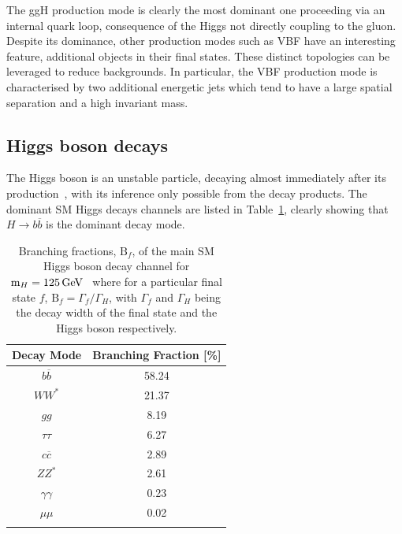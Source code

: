 The ggH production mode is clearly the most dominant one proceeding via an internal quark loop, consequence of the Higgs not directly coupling to the gluon. Despite its dominance, other production modes such as VBF have an interesting feature, additional objects in their final states. These distinct topologies can be leveraged to reduce backgrounds. In particular, the VBF production mode is characterised by two additional energetic jets which tend to have a large spatial separation and a high invariant mass.

\newpage
\subsection{Higgs boson decays}

The Higgs boson is an unstable particle, decaying almost immediately after its production~\cite{MarkThompson}, with its inference only possible from the decay products. The dominant SM Higgs decays channels are listed in Table~\ref{Table:Introduction_HiggsBranchingFractions}, clearly showing that $H\rightarrow b\overline{b}$ is the dominant decay mode. 

\begin{table}[h]
\centering
\renewcommand{\arraystretch}{1.5} %
\setlength{\tabcolsep}{12pt} %
\begin{tabular}{|c|c|}
\hline
Decay Mode                  & Branching Fraction {[}\%{]} \\ \hline \hline
$b\overline{b}$             & 58.24 \\ 
\arrayrulecolor{lightgray} \hline
$WW^*$                      & 21.37 \\ 
\arrayrulecolor{lightgray} \hline
$gg$                        & 8.19  \\ 
\arrayrulecolor{lightgray} \hline
$\tau\tau$                  & 6.27  \\ 
\arrayrulecolor{lightgray} \hline
$c\overline{c}$             & 2.89  \\ 
\arrayrulecolor{lightgray} \hline
$ZZ^*$                      & 2.61  \\ 
\arrayrulecolor{lightgray} \hline
$\gamma\gamma$              & 0.23  \\ 
\arrayrulecolor{lightgray} \hline
$\mu\mu$                    & 0.02  \\ 
\arrayrulecolor{black} \hline
\end{tabular}
\caption{Branching fractions, $\text{B}_f$, of the main SM Higgs boson decay channel for $\text{m}_H = 125\,\text{Ge\hspace{-.08em}V}$~\cite{HiggsProduction_XS_13TeV,HiggsProduction_XS_13p6TeV} where for a particular final state $f$, $\text{B}_f = \Gamma_f/\Gamma_H$, with $\Gamma_f$ and $\Gamma_H$ being the decay width of the final state and the Higgs boson respectively.}
\label{Table:Introduction_HiggsBranchingFractions}
\end{table}


